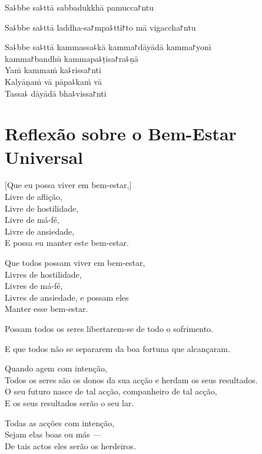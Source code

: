 Sa꜕bbe sa꜕ttā sabbadukkhā pamucca꜓ntu

Sa꜕bbe sa꜕ttā laddha-sa꜓mpa꜕tti꜓to mā vigaccha꜓ntu

Sa꜕bbe sa꜕ttā kammassa꜕kā kamma꜓dāyādā kamma꜓yonī\\
\vin kamma꜓bandhū kammapa꜕ṭisa꜓ra꜕ṇā\\
Yaṁ kammaṁ ka꜕rissa꜓nti\\
Kalyāṇaṁ vā pāpa꜕kaṁ vā\\
Tassa꜕ dāyādā bha꜕vissa꜓nti

\chapter[Bem-Estar Universal]{Reflexão sobre o Bem-Estar Universal}


\begin{leader}
\end{leader}

[Que eu possa viver em bem-estar,]\\
Livre de aflição,\\
Livre de hostilidade,\\
Livre de má-fé,\\
Livre de ansiedade,\\
E possa eu manter este bem-estar.

Que todos possam viver em bem-estar,\\
Livres de hostilidade,\\
Livres de má-fé,\\
Livres de ansiedade, e possam eles\\
Manter esse bem-estar.

Possam todos os seres libertarem-se de todo o sofrimento.

E que todos não se separarem da boa fortuna que alcançaram.

Quando agem com intenção,\\
Todos os seres são os donos da sua acção e herdam os seus resultados.\\
O seu futuro nasce de tal acção, companheiro de tal acção,\\
E os seus resultados serão o seu lar.

Todas as acções com intenção,\\
Sejam elas boas ou más ---\\
De tais actos eles serão os herdeiros.

